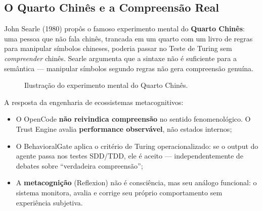 \subsection{O Quarto Chinês e a Compreensão Real}

John Searle (1980) \cite{searle1980minds} propôs o famoso experimento mental do \textbf{Quarto Chinês}: uma pessoa que não fala chinês, trancada em um quarto com um livro de regras para manipular símbolos chineses, poderia passar no Teste de Turing sem \textit{compreender} chinês. Searle argumenta que a sintaxe não é suficiente para a semântica --- manipular símbolos segundo regras não gera compreensão genuína.

\begin{figure}[htbp]
\centering
{}
\caption{Ilustração do experimento mental do Quarto Chinês.}
\label{fig:chinese_room}
\end{figure}

A resposta da engenharia de ecossistemas metacognitivos:

\begin{itemize}
    \item O OpenCode \textbf{não reivindica compreensão} no sentido fenomenológico. O Trust Engine avalia \textbf{performance observável}, não estados internos;
    \item O BehavioralGate aplica o critério de Turing operacionalizado: se o output do agente passa nos testes SDD/TDD, ele é aceito --- independentemente de debates sobre ``verdadeira compreensão'';
    \item A \textbf{metacognição} (Reflexion) não é consciência, mas seu análogo funcional: o sistema monitora, avalia e corrige seu próprio comportamento sem experiência subjetiva.
\end{itemize}

